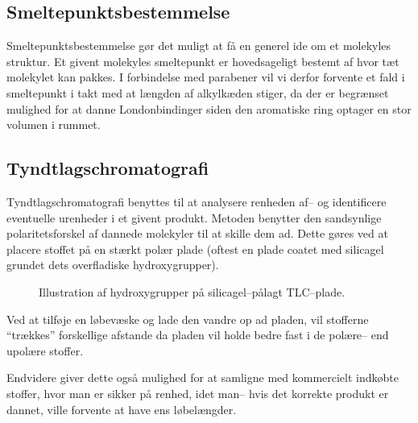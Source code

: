     \subsection{Smeltepunktsbestemmelse}
    Smeltepunktsbestemmelse gør det muligt at få en generel ide om et molekyles struktur. Et givent molekyles smeltepunkt er hovedsageligt bestemt af hvor tæt molekylet kan pakkes. I forbindelse med parabener vil vi derfor forvente et fald i smeltepunkt i takt med at længden af alkylkæden stiger, da der er begrænset mulighed for at danne Londonbindinger siden den aromatiske ring optager en stor volumen i rummet.

    \subsection{Tyndtlagschromatografi}
    Tyndtlagschromatografi benyttes til at analysere renheden af-- og identificere eventuelle urenheder i et givent produkt. Metoden benytter den sandsynlige polaritetsforskel af dannede molekyler til at skille dem ad. Dette gøres ved at placere stoffet på en stærkt polær plade (oftest en plade coatet med silicagel grundet dets overfladiske hydroxygrupper). 
    \begin{figure}[H]\centering
        \caption{Illustration af hydroxygrupper på silicagel--pålagt TLC--plade.}
    \end{figure}
    Ved at tilføje en løbevæske og lade den vandre op ad pladen, vil stofferne ``trækkes'' forskellige afstande da pladen vil holde bedre fast i de polære-- end upolære stoffer.

    Endvidere giver dette også mulighed for at samligne med kommercielt indkøbte stoffer, hvor man er sikker på renhed, idet man-- hvis det korrekte produkt er dannet, ville forvente at have ens løbelængder.
    

